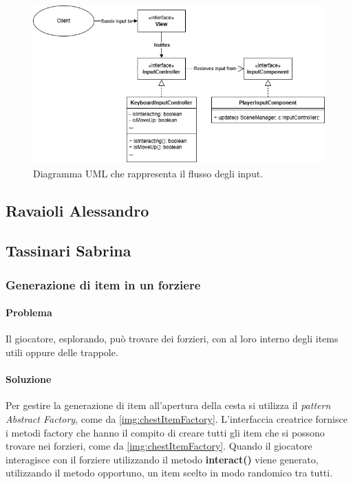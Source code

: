 \documentclass{report}
\begin{document}
\begin{figure}[H]
    \centering
    \includegraphics[width=13cm]{ObserverPattern.png}
    \caption{Diagramma UML che rappresenta il flusso degli input.}
    \label{img:ObserverPattern.png}
\end{figure}


\subsection{Ravaioli Alessandro}

\newpage
\subsection{Tassinari Sabrina}

\subsubsection{Generazione di item in un forziere}

\paragraph{Problema} Il giocatore, esplorando, può trovare dei forzieri, con al loro interno degli items utili oppure delle trappole. 

\paragraph{Soluzione} Per gestire la generazione di item all'apertura della cesta si utilizza il \textit{pattern Abstract Factory}, come da \ref{img:chestItemFactory}.
%
L'interfaccia creatrice fornisce i metodi factory che hanno il compito di creare tutti gli item che si possono trovare nei forzieri, come da \ref{img:chestItemFactory}. 
%
Quando il giocatore interagisce con il forziere utilizzando il metodo \textbf{interact()} viene generato, utilizzando il metodo opportuno, un item scelto in modo randomico tra tutti.
\end{document}
